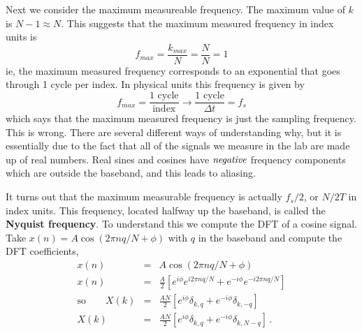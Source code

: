 
Next we consider the maximum measureable frequency.
The maximum value of $k$ is $N-1\approx N$. This suggests that the maximum measured frequency in index units is
\begin{displaymath}
  f_{max}=\frac{k_{max}}{N}=\frac{N}{N}=1
\end{displaymath}
ie, the maximum measured frequency corresponds to an exponential that goes through 1 cycle per index. In physical units this frequency is given by
\begin{displaymath}
  f_{max}=\frac{\text{1 cycle}}{\text{index}}\rightarrow\frac{\text{1 cycle}}{\Delta t}=f_{s}
\end{displaymath}
which says that the maximum measured frequency is just the sampling frequency.
This is wrong.
There are several different ways of understanding why, but it is essentially due to the fact that all of the signals we measure in the lab are made up of real numbers.
Real sines and cosines have $\emph{negative}$ frequency components which are outside the baseband, and this leads to aliasing.

It turns out that the maximum measurable frequency is actually $f_s/2$, or $N/2T$ in index units.
This frequency, located halfway up the baseband, is called the \textbf{Nyquist frequency}.
To understand this we compute the DFT of a cosine signal. Take $x(n)=A\cos (2\pi nq/N+\phi)$ with $q$ in the baseband and compute the DFT coefficients,
\begin{eqnarray*}
  x(n) & = & A\cos\left(2\pi nq/N+\phi \right)\\
  x(n) & = & \frac{A}{2}\left[e^{i\phi}e^{i2\pi nq/N}+e^{-i\phi}e^{-i2\pi nq/N}\right]\\
  \text{so}\qquad X(k) & = & \frac{AN}{2}\left[e^{i\phi}\delta_{k,q}+e^{-i\phi}\delta_{k,-q}\right]\\
  X(k) & = & \frac{AN}{2}\left[e^{i\phi}\delta_{k,q}+e^{-i\phi}\delta_{k,N-q}\right]
  \, .
\end{eqnarray*}

